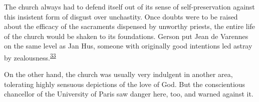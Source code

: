 The church always had to defend itself out of its sense of
self-preservation against this insistent form of disgust over
unchastity. Once doubts were to be raised about the efficacy of the
sacraments dispensed by unworthy priests, the entire life of the church
would be shaken to its foundations. Gerson put Jean de Varennes on the
same level as Jan Hus, someone with originally good intentions led
astray by
zealousness.\textsuperscript{\protect\hypertarget{15_Chapter_Eight__RELIGIOUS_EXCITAT.xhtmlux5cux23id_841}{\protect\hyperlink{23_NOTES.xhtmlux5cux23id_842}{33}}}

On the other hand, the church was usually very indulgent in another
area, tolerating highly sensuous depictions of the love of God. But the
conscientious chancellor of the University of Paris saw danger here,
too, and warned against it.

